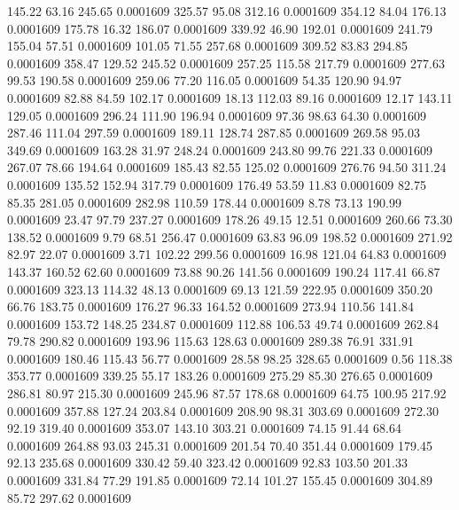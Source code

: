  145.22   63.16  245.65   0.0001609
 325.57   95.08  312.16   0.0001609
 354.12   84.04  176.13   0.0001609
 175.78   16.32  186.07   0.0001609
 339.92   46.90  192.01   0.0001609
 241.79  155.04   57.51   0.0001609
 101.05   71.55  257.68   0.0001609
 309.52   83.83  294.85   0.0001609
 358.47  129.52  245.52   0.0001609
 257.25  115.58  217.79   0.0001609
 277.63   99.53  190.58   0.0001609
 259.06   77.20  116.05   0.0001609
  54.35  120.90   94.97   0.0001609
  82.88   84.59  102.17   0.0001609
  18.13  112.03   89.16   0.0001609
  12.17  143.11  129.05   0.0001609
 296.24  111.90  196.94   0.0001609
  97.36   98.63   64.30   0.0001609
 287.46  111.04  297.59   0.0001609
 189.11  128.74  287.85   0.0001609
 269.58   95.03  349.69   0.0001609
 163.28   31.97  248.24   0.0001609
 243.80   99.76  221.33   0.0001609
 267.07   78.66  194.64   0.0001609
 185.43   82.55  125.02   0.0001609
 276.76   94.50  311.24   0.0001609
 135.52  152.94  317.79   0.0001609
 176.49   53.59   11.83   0.0001609
  82.75   85.35  281.05   0.0001609
 282.98  110.59  178.44   0.0001609
   8.78   73.13  190.99   0.0001609
  23.47   97.79  237.27   0.0001609
 178.26   49.15   12.51   0.0001609
 260.66   73.30  138.52   0.0001609
   9.79   68.51  256.47   0.0001609
  63.83   96.09  198.52   0.0001609
 271.92   82.97   22.07   0.0001609
   3.71  102.22  299.56   0.0001609
  16.98  121.04   64.83   0.0001609
 143.37  160.52   62.60   0.0001609
  73.88   90.26  141.56   0.0001609
 190.24  117.41   66.87   0.0001609
 323.13  114.32   48.13   0.0001609
  69.13  121.59  222.95   0.0001609
 350.20   66.76  183.75   0.0001609
 176.27   96.33  164.52   0.0001609
 273.94  110.56  141.84   0.0001609
 153.72  148.25  234.87   0.0001609
 112.88  106.53   49.74   0.0001609
 262.84   79.78  290.82   0.0001609
 193.96  115.63  128.63   0.0001609
 289.38   76.91  331.91   0.0001609
 180.46  115.43   56.77   0.0001609
  28.58   98.25  328.65   0.0001609
   0.56  118.38  353.77   0.0001609
 339.25   55.17  183.26   0.0001609
 275.29   85.30  276.65   0.0001609
 286.81   80.97  215.30   0.0001609
 245.96   87.57  178.68   0.0001609
  64.75  100.95  217.92   0.0001609
 357.88  127.24  203.84   0.0001609
 208.90   98.31  303.69   0.0001609
 272.30   92.19  319.40   0.0001609
 353.07  143.10  303.21   0.0001609
  74.15   91.44   68.64   0.0001609
 264.88   93.03  245.31   0.0001609
 201.54   70.40  351.44   0.0001609
 179.45   92.13  235.68   0.0001609
 330.42   59.40  323.42   0.0001609
  92.83  103.50  201.33   0.0001609
 331.84   77.29  191.85   0.0001609
  72.14  101.27  155.45   0.0001609
 304.89   85.72  297.62   0.0001609

